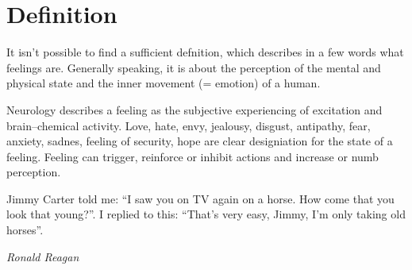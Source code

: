 \documentclass[../main.tex]{subfiles}
\begin{document}
\section{Definition}

It isn't possible to find a sufficient defnition, which describes in a few words what feelings are.
Generally speaking, it is about the perception of the mental and physical state and the inner movement (= emotion) of a human.

Neurology describes a feeling as the subjective experiencing of excitation and brain--chemical activity.
Love, hate, envy, jealousy, disgust, antipathy, fear, anxiety, sadnes, feeling of security, hope are clear designiation for the state of a feeling.
Feeling can trigger, reinforce or inhibit actions and increase or numb perception.

\epigraph{Jimmy Carter told me: ``I saw you on TV again on a horse. How come that you look that young?''. I replied to this: ``That's very easy, Jimmy, I'm only taking old horses''.}{\textit{Ronald Reagan}}
\end{document}
